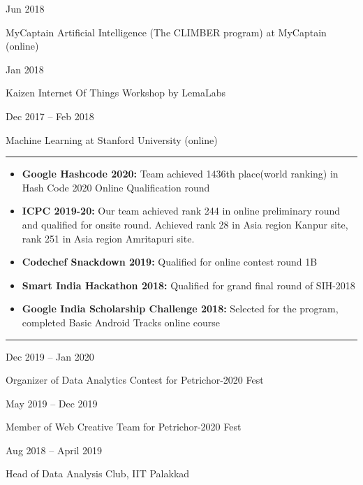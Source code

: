 \documentclass[a4paper,10pt]{article}
\newlength{\cvcolumngapwidth}
\newlength{\cvleftcolumnwidth}
\newlength{\cvrightcolumnwidth}
\newcommand{\cvsectionstyle}[1]{{\normalsize\cvsectionfont\textcolor{cvsectioncolor}{#1}}}
\newcommand{\cvtitlestyle}[1]{{\large\cvtitlefont\textcolor{cvtitlecolor}{#1}}}
\newcommand{\cvdurationstyle}[1]{{\small\cvdurationfont\textcolor{cvdurationcolor}{#1}}}
\newcommand{\cvheadingstyle}[1]{{\normalsize\cvheadingfont\textcolor{cvheadingcolor}{#1}}}
\newlength{\cvafteritemskipamount}
\newlength{\cvaftersectionskipamount}
\newlength{\cvbetweensectionandheadingextraskipamount}
\newlength{\cvaftertitleskipamount}
\newlength{\cvparskip}
\newcommand{\cvsection}[1]{
    \begin{minipage}[t]{\cvleftcolumnwidth}
        \raggedleft\cvsectionstyle{#1}
    \end{minipage}%
    \hspace{\cvcolumngapwidth}%
    \begin{minipage}[t]{\cvrightcolumnwidth}
        \textcolor{cvrulecolor}{\rule{\cvrightcolumnwidth}{0.3mm}}
    \end{minipage}

    \vspace{\cvaftersectionskipamount}
}
\newcommand{\cvitem}[2]{
    \begin{minipage}[t]{\cvleftcolumnwidth}
        \raggedleft #1
    \end{minipage}%
    \hspace{\cvcolumngapwidth}%
    \begin{minipage}[t]{\cvrightcolumnwidth}
        \setlength{\parskip}{\cvparskip} #2
    \end{minipage}

    \vspace{\cvafteritemskipamount}
}
\newcommand{\cvtitle}[1]{
    \cvtitlestyle{#1}

    \vspace{\cvaftertitleskipamount}
    \vspace{-\cvparskip}
}
\begin{document}
\cvitem{
    \cvdurationstyle{Jun 2018}
}{
    \cvtitle{MyCaptain Artificial Intelligence (The CLIMBER program) at MyCaptain (online)}
}

\cvitem{
    \cvdurationstyle{Jan 2018}
}{
    \cvtitle{Kaizen Internet Of Things Workshop by LemaLabs}
}

\cvitem{
    \cvdurationstyle{Dec 2017 -- Feb 2018}
}{
    \cvtitle{Machine Learning at Stanford University (online)}
}



\cvsection{ACHIEVEMENTS}

\vspace{\cvbetweensectionandheadingextraskipamount}

\cvitem{
    \cvheadingstyle{}
}{
    
    \begin{itemize}[leftmargin=*]
    
        \item \textbf{Google Hashcode 2020:} Team achieved 1436th place(world ranking) in Hash Code 2020 Online Qualification round
        \item \textbf{ICPC 2019-20:} Our team achieved rank 244 in online preliminary round and qualified for onsite round. Achieved rank 28 in Asia region Kanpur site, rank 251 in Asia region Amritapuri site.
        \item \textbf{Codechef Snackdown 2019:} Qualified for online contest round 1B
        \item \textbf{Smart India Hackathon 2018:} Qualified for grand final round of SIH-2018
        \item \textbf{Google India Scholarship Challenge 2018:} Selected for the program, completed Basic Android Tracks online course
        
    \end{itemize}

    
}

\cvsection{POSITION OF RESPONSIBILITIES}

\vspace{\cvbetweensectionandheadingextraskipamount}

\cvitem{
    \cvdurationstyle{Dec 2019 -- Jan 2020}
}{
    \cvtitle{Organizer of Data Analytics Contest for Petrichor-2020 Fest}
}

\cvitem{
    \cvdurationstyle{May 2019 -- Dec 2019}
}{
    \cvtitle{Member of Web Creative Team for Petrichor-2020 Fest}
}

\cvitem{
    \cvdurationstyle{Aug 2018 -- April 2019}
}{
    \cvtitle{Head of Data Analysis Club, IIT Palakkad}
}
\end{document}
